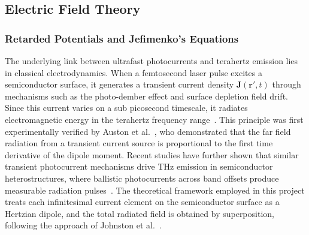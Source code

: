 \documentclass[12pt]{final_project_report}
\begin{document}
\subsection{Electric Field Theory}
\subsubsection{Retarded Potentials and Jefimenko's Equations}
The underlying link between ultrafast photocurrents and terahertz emission lies in classical electrodynamics. When a femtosecond laser pulse excites a semiconductor surface, it generates a transient current density $\mathbf{J}(\mathbf{r}', t)$ through mechanisms such as the photo-dember effect and surface depletion field drift. Since this current varies on a sub picosecond timescale, it radiates electromagnetic energy in the terahertz frequency range~\cite{Yang2023}. This principle was first experimentally verified by Auston et al.~\cite{auston_picosecond_1984}, who demonstrated that the far field radiation from a transient current source is proportional to the first time derivative of the dipole moment. Recent studies have further shown that similar transient photocurrent mechanisms drive THz emission in semiconductor heterostructures, where ballistic photocurrents across band offsets produce measurable radiation pulses~\cite{Malevich2021}. The theoretical framework employed in this project treats each infinitesimal current element on the semiconductor surface as a Hertzian dipole, and the total radiated field is obtained by superposition, following the approach of Johnston et al.~\cite{SimulationTHz}.
\end{document}
